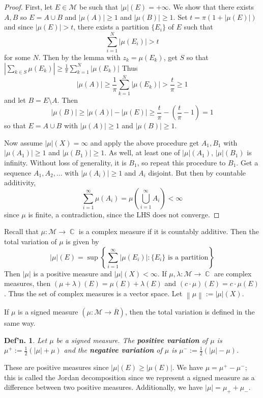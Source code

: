 \documentclass[12pt, a4paper]{book}
\DeclareMathOperator{\C}{\mathbb{C}}
\newcommand{\norm}[1]{\left\lVert#1\right\rVert} %
\newtheorem{definition}[theorem]{Def'n.}
\theoremstyle{nonumberplain}
\newtheorem{proof}{Proof}
\begin{document}
\begin{proof}
    First, let $E\in\mathcal{M}$ be such that $|\mu|(E)=+\infty$.
    We show that there exists $A,B$ so $E=A\cup B$ and $|\mu(A)|\geq 1$ and $|\mu(B)|\geq 1$.
    Set $t=\pi(1+|\mu(E)|)$ and since $|\mu(E)|>t$, there exists a partition $\{E_i\}$ of $E$ such that
    \[\sum\limits_{i=1}^N|\mu(E_i)|>t\]
    for some $N$.
    Then by the lemma with $z_k=\mu(E_k)$, get $S$ so that $\left\lvert\sum_{k\in S}\mu(E_k)\right\rvert\geq\frac{1}{\pi}\sum_{k=1}^N|\mu(E_k)|$
    Thus
    \[|\mu(A)|\geq\frac{1}{\pi}\sum\limits_{k=1}^N\left\lvert\mu(E_k)\right\rvert>\frac{t}{\pi}\geq 1\]
    and let $B=E\setminus A$.
    Then
    \[|\mu(B)|\geq|\mu(A)|-|\mu(E)|\geq\frac{t}{\pi}-\left(\frac{t}{\pi}-1\right)=1\]
    so that $E=A\cup B$ with $|\mu(A)|\geq1$ and $|\mu(B)|\geq1$.

    Now assume $|\mu|(X)=\infty$ and apply the above procedure get $A_1,B_1$ with $|\mu(A_1)|\geq 1$ and $|\mu(B_1)|\geq 1$.
    As well, at least one of $|\mu|(A_1)$, $|\mu|(B_1)$ is infinity.
    Without loss of generality, it is $B_1$, so repeat this procedure to $B_1$.
    Get a sequence $A_1,A_2,\ldots$ with $|\mu(A_i)|\geq 1$ and $A_i$ disjoint.
    But then by countable additivity,
    \[\sum\limits_{i=1}^\infty \mu(A_i)=\mu\left(\bigcup\limits_{i=1}^\infty A_i\right)<\infty\]
    since $\mu$ is finite, a contradiction, since the LHS does not converge.
\end{proof}
Recall that $\mu:\mathcal{M}\to\C$ is a complex measure if it is countably additive.
Then the total variation of $\mu$ is given by
\[|\mu|(E)=\sup\left\{\sum\limits_{i=1}^\infty|\mu(E_i)|:\{E_i\}\text{ is a partition}\right\}\]
Then $|\mu|$ is a positive measure and $|\mu|(X)<\infty$.
If $\mu,\lambda:\mathcal{M}\to\C$ are complex measures, then $(\mu+\lambda)(E)=\mu(E)+\lambda(E)$ and $(c\cdot\mu)(E)=c\cdot\mu(E)$.
Thus the set of complex measures is a vector space.
Let $\norm{\mu}:=|\mu|(X)$.

If $\mu$ is a signed measure $(\mu:\mathcal{M}\to\overline{R})$, then the total variation is defined in the same way.
\begin{definition}
    Let $\mu$ be a signed measure.
    The \textbf{positive variation} of $\mu$ is $\mu^+:=\frac{1}{2}(|\mu|+\mu)$ and the \textbf{negative variation} of $\mu$ is $\mu^-:=\frac{1}{2}(|\mu|-\mu)$.
\end{definition}
These are positive measures since $|\mu|(E)\geq|\mu(E)|$.
We have $\mu=\mu^+-\mu^-$; this is called the Jordan decomposition since we represent a signed measure as a difference between two positive measures.
Additionally, we have $|\mu|=\mu_++\mu_-$.
\end{document}
